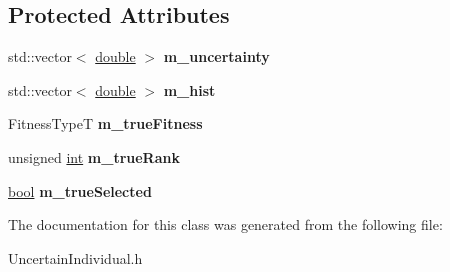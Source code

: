 \subsection*{Protected Attributes}
\begin{DoxyCompactItemize}
\item 
std\+::vector$<$ \hyperlink{classdouble}{double} $>$ {\bfseries m\+\_\+uncertainty}\hypertarget{classUncertainIndividual_ac5f30637f666f2388930b70d7bd58f25}{}\label{classUncertainIndividual_ac5f30637f666f2388930b70d7bd58f25}

\item 
std\+::vector$<$ \hyperlink{classdouble}{double} $>$ {\bfseries m\+\_\+hist}\hypertarget{classUncertainIndividual_ab8679af59a7ec3926c5dc7f06335416d}{}\label{classUncertainIndividual_ab8679af59a7ec3926c5dc7f06335416d}

\item 
Fitness\+TypeT {\bfseries m\+\_\+true\+Fitness}\hypertarget{classUncertainIndividual_a1e4300ea3c248c8b04667f655690dfc1}{}\label{classUncertainIndividual_a1e4300ea3c248c8b04667f655690dfc1}

\item 
unsigned \hyperlink{classint}{int} {\bfseries m\+\_\+true\+Rank}\hypertarget{classUncertainIndividual_a30a285084e80349ee29b0de0437ee8f8}{}\label{classUncertainIndividual_a30a285084e80349ee29b0de0437ee8f8}

\item 
\hyperlink{classbool}{bool} {\bfseries m\+\_\+true\+Selected}\hypertarget{classUncertainIndividual_a8b61c869d0d7280fb726c5d9b2eaa600}{}\label{classUncertainIndividual_a8b61c869d0d7280fb726c5d9b2eaa600}

\end{DoxyCompactItemize}


The documentation for this class was generated from the following file\+:\begin{DoxyCompactItemize}
\item 
Uncertain\+Individual.\+h\end{DoxyCompactItemize}
